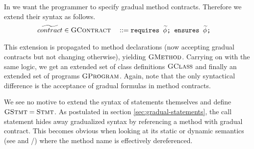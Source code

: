 
In \gvl we want the programmer to specify gradual method contracts.
Therefore we extend their syntax as follows.
\begin{align*}
\widetilde{contract} & \in \textsc{GContract}   &  & ::= \texttt{requires $\widetilde{\phi}$;~ensures $\widetilde{\phi}$;}
\end{align*}

This extension is propagated to method declarations (now accepting gradual contracts but not changing otherwise), yielding $\textsc{GMethod}$.
Carrying on with the same logic, we get an extended set of class definitions $\textsc{GClass}$ and finally an extended set of programs $\textsc{GProgram}$.
Again, note that the only syntactical difference is the acceptance of gradual formulas in method contracts.

We see no motive to extend the syntax of statements themselves and define $\textsc{GStmt} = \textsc{Stmt}$.
As postulated in section \ref{sec:gradual-statements}, the call statement hides away gradualized syntax by referencing a method with gradual contract.
This becomes obvious when looking at its static or dynamic semantics (see  and /) where the method name is effectively dereferenced.

